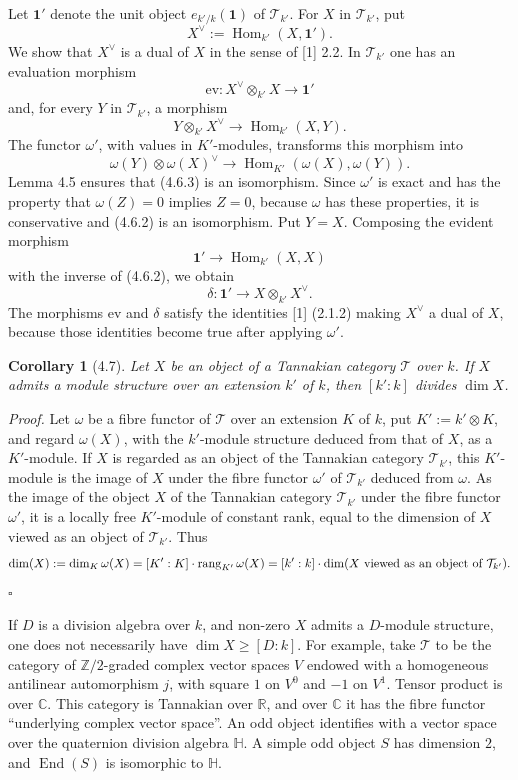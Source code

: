 \documentclass[10pt]{article}
\newcommand{\End}{\operatorname{End}}
\newcommand{\Hom}{\operatorname{Hom}}
\newcommand{\rang}{\operatorname{rang}}
\newcommand{\T}{\mathcal T}
\newcommand{\one}{\mathbf{1}}
\theoremstyle{deligne}
\newtheorem*{corollary*}{Corollary}
\newenvironment{proofdel}{\textit{Proof.}}{\hfill$\square$}
\newcommand{\heading}[1]{\vspace{0.7em}\noindent{\bfseries #1}\quad}
\begin{document}
\heading{4.6. End of the proof when \(k'=k(a^{1/p})\).}
Let \(\one'\) denote the unit object \(e_{k'/k}(\one)\) of \(\T_{k'}\). For \(X\) in \(\T_{k'}\), put
\[
X^\vee:=\Hom_{k'}(X,\one').
\]
We show that \(X^\vee\) is a dual of \(X\) in the sense of [1] 2.2. In \(\T_{k'}\) one has an evaluation morphism
\[
\tag{4.6.1}
\mathrm{ev}:X^\vee\otimes_{k'}X\longrightarrow \one'
\]
and, for every \(Y\) in \(\T_{k'}\), a morphism
\[
\tag{4.6.2}
Y\otimes_{k'}X^\vee\longrightarrow \Hom_{k'}(X,Y).
\]
The functor \(\omega'\), with values in \(K'\)-modules, transforms this morphism into
\[
\tag{4.6.3}
\omega(Y)\otimes \omega(X)^\vee\longrightarrow
\Hom_{K'}(\omega(X),\omega(Y)).
\]
Lemma 4.5 ensures that (4.6.3) is an isomorphism. Since \(\omega'\) is exact and has the property that \(\omega(Z)=0\) implies \(Z=0\), because \(\omega\) has these properties, it is conservative and (4.6.2) is an isomorphism. Put \(Y=X\). Composing the evident morphism
\[
\one'\longrightarrow \Hom_{k'}(X,X)
\]
with the inverse of (4.6.2), we obtain
\[
\delta:\one'\longrightarrow X\otimes_{k'}X^\vee.
\]
The morphisms \(\mathrm{ev}\) and \(\delta\) satisfy the identities [1] (2.1.2) making \(X^\vee\) a dual of \(X\), because those identities become true after applying \(\omega'\).

\begin{corollary*}[4.7]
Let \(X\) be an object of a Tannakian category \(\T\) over \(k\). If \(X\) admits a module structure over an extension \(k'\) of \(k\), then \([k':k]\) divides \(\dim X\).
\end{corollary*}

\begin{proofdel}
Let \(\omega\) be a fibre functor of \(\T\) over an extension \(K\) of \(k\), put \(K':=k'\otimes K\), and regard \(\omega(X)\), with the \(k'\)-module structure deduced from that of \(X\), as a \(K'\)-module. If \(X\) is regarded as an object of the Tannakian category \(\T_{k'}\), this \(K'\)-module is the image of \(X\) under the fibre functor \(\omega'\) of \(\T_{k'}\) deduced from \(\omega\). As the image of the object \(X\) of the Tannakian category \(\T_{k'}\) under the fibre functor \(\omega'\), it is a locally free \(K'\)-module of constant rank, equal to the dimension of \(X\) viewed as an object of \(\T_{k'}\). Thus
\[
\dim(X):=\dim_K\omega(X)=[K':K]\cdot \rang_{K'}\omega(X)
=[k':k]\cdot \dim(X\hbox{ viewed as an object of }\T_{k'}).
\]
\end{proofdel}

\heading{4.8. Warning.}
If \(D\) is a division algebra over \(k\), and non-zero \(X\) admits a \(D\)-module structure, one does not necessarily have \(\dim X\ge [D:k]\). For example, take \(\T\) to be the category of \(\mathbb Z/2\)-graded complex vector spaces \(V\) endowed with a homogeneous antilinear automorphism \(j\), with square \(1\) on \(V^0\) and \(-1\) on \(V^1\). Tensor product is over \(\mathbb C\). This category is Tannakian over \(\mathbb R\), and over \(\mathbb C\) it has the fibre functor ``underlying complex vector space''. An odd object identifies with a vector space over the quaternion division algebra \(\mathbb H\). A simple odd object \(S\) has dimension \(2\), and \(\End(S)\) is isomorphic to \(\mathbb H\).
\end{document}
